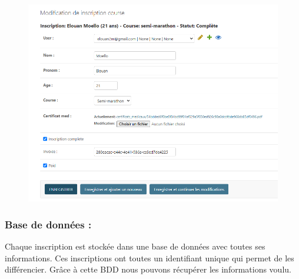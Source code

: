 \documentclass[12pt]{article} %
\begin{document}
            \begin{figure}[hbtp]
            \centering
            \includegraphics[scale=0.6]{images/admin_gestion.PNG}
            \end{figure}
            \newpage
        \subsubsection{Base de données :}
            Chaque inscription est stockée dans une base de données avec toutes ses informations. Ces inscriptions ont toutes un identifiant unique qui permet de les différencier. Grâce à cette BDD nous pouvons récupérer les informations voulu.


		
		
\end{document}
